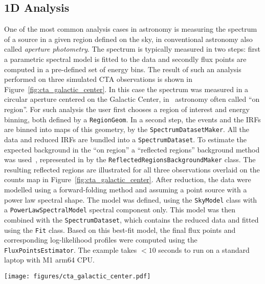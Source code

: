 \documentclass[longauth]{aa}
\newcommand{\code}[1]{\texttt{#1}}
\begin{document}
\subsection{1D Analysis}
\label{ssec:1d-analysis}
One of the most common analysis cases in \gammaray astronomy is measuring the
spectrum of a source in a given region defined on the sky, in conventional
astronomy also called \textit{aperture photometry}. The spectrum is typically measured
in two steps: first a parametric spectral model is fitted to the data and
secondly flux points are computed in a pre-defined set of energy bins. The
result of such an analysis performed on three simulated CTA observations is
shown in Figure~\ref{fig:cta_galactic_center}. In this case the spectrum was
measured in a circular aperture centered on the Galactic Center, in
\gammaray~astronomy often called \enquote{on region}. For such analysis the user first
chooses a region of interest and energy binning, both defined by a
\code{RegionGeom}. In a second step, the events and the IRFs are binned
into maps of this geometry, by the \code{SpectrumDatasetMaker}. All the data and
reduced IRFs are bundled into a \code{SpectrumDataset}. To estimate
the expected background in the \enquote{on region} a \enquote{reflected regions} background
method was used~\citep{Berge07}, represented in \gammapy by the
\code{ReflectedRegionsBackgroundMaker} class. The resulting reflected regions are
illustrated for all three observations overlaid on the counts map in Figure~\ref{fig:cta_galactic_center}.
After reduction, the data were modelled using a forward-folding method and assuming
a point source with a power law spectral shape. The model was defined, using
the \code{SkyModel} class with a \code{PowerLawSpectralModel} spectral component only.
This model was then combined with the \code{SpectrumDataset}, which contains the reduced data 
and fitted using the \code{Fit} class. Based on this best-fit model, the final flux points and corresponding
log-likelihood profiles were computed using the \code{FluxPointsEstimator}. The
example takes $<10$ seconds to run on a standard laptop with M1 arm64 CPU.

\begin{figure*}
	\centering
	\texttt{[image: figures/cta\_galactic\_center.pdf]}
	\caption{
		Example of a one dimensional spectral analysis of the Galactic Center for three simulated
		observations from the first CTA data challenge. The left image shows the maps of counts with the signal
		region in white and the reflected background regions for the three different observations
		overlaid in different colors. The right image shows the resulting spectral flux points and
		their corresponding log-likelihood profiles. The flux points are shown in orange, with the
		horizontal bar illustrating the width of the energy bin and the vertical bar the $1~\sigma$
		error. The log-likelihood profiles for each enetgy bin are shown in the background. The colormap
		illustrates the difference of the log-likelihood to the log-likelihood of the best fit value.
		}
	\label{fig:cta_galactic_center}
\end{figure*}
\end{document}
